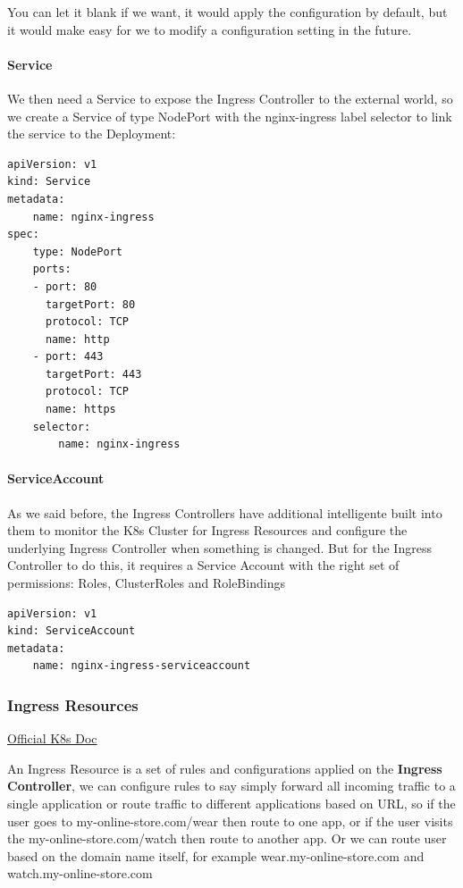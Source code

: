 \documentclass{article}
\newenvironment{codetemplate}[1][]{%
  \mybasecolorbox[#1]
  \itshape
}{%
  \endmybasecolorbox
}
\begin{document}
You can let it blank if we want, it would apply the configuration by default, but it would make easy for we to modify a configuration setting in the future.

\paragraph{Service}
We then need a Service to expose the Ingress Controller to the external world, so we create a Service of type NodePort with the nginx-ingress label selector to link the service to the Deployment:

\begin{codetemplate}{}
\begin{verbatim}
apiVersion: v1
kind: Service
metadata:
    name: nginx-ingress
spec:
    type: NodePort
    ports:
    - port: 80
      targetPort: 80
      protocol: TCP
      name: http
    - port: 443
      targetPort: 443
      protocol: TCP
      name: https
    selector:
        name: nginx-ingress
\end{verbatim}
\end{codetemplate}

\paragraph{ServiceAccount}

As we said before, the Ingress Controllers have additional intelligente built into them to monitor the K8s Cluster for Ingress Resources and configure the underlying Ingress Controller when something is changed. But for the Ingress Controller to do this, it requires a Service Account with the right set of permissions: Roles, ClusterRoles and RoleBindings

\begin{codetemplate}{}
\begin{verbatim}
apiVersion: v1
kind: ServiceAccount
metadata:
    name: nginx-ingress-serviceaccount
\end{verbatim}
\end{codetemplate}

\subsubsection{Ingress Resources}

\href{https://kubernetes.io/docs/concepts/services-networking/ingress/}{Official K8s Doc}

An Ingress Resource is a set of rules and configurations applied on the \textbf{Ingress Controller}, we can configure rules to say simply forward all incoming traffic to a single application or route traffic to different applications based on URL, so if the user  goes to my-online-store.com/wear then route to one app, or if the user visits the my-online-store.com/watch then route to another app. Or we can route user based on the domain name itself, for example wear.my-online-store.com and watch.my-online-store.com
\end{document}
